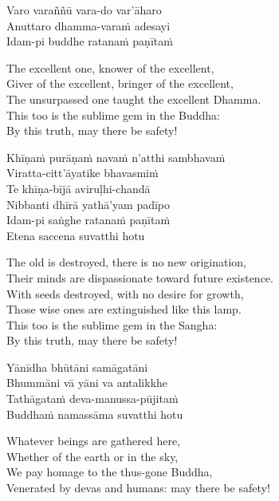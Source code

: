 Varo varaññū vara-do var’āharo\\
Anuttaro dhamma-varaṁ adesayi\\
Idam-pi buddhe ratanaṁ paṇītaṁ

\begin{english}
  The excellent one, knower of the excellent,\\
  Giver of the excellent, bringer of the excellent,\\
  The unsurpassed one taught the excellent Dhamma.\\
  This too is the sublime gem in the Buddha:\\
  By this truth, may there be safety!
\end{english}

Khīṇaṁ purāṇaṁ navaṁ n’atthi sambhavaṁ\\
Viratta-citt’āyatike bhavasmiṁ\\
Te khīṇa-bījā aviruḷhi-chandā\\
Nibbanti dhīrā yathā’yam padīpo\\
Idam-pi saṅghe ratanaṁ paṇītaṁ\\
Etena saccena suvatthi hotu

\begin{english}
  The old is destroyed, there is no new origination,\\
  Their minds are dispassionate toward future existence.\\
  With seeds destroyed, with no desire for growth,\\
  Those wise ones are extinguished like this lamp.\\
  This too is the sublime gem in the Sangha:\\
  By this truth, may there be safety!
\end{english}

Yānīdha bhūtāni samāgatāni\\
Bhummāni vā yāni va antalikkhe\\
Tathāgataṁ deva-manussa-pūjitaṁ\\
Buddhaṁ namassāma suvatthi hotu

\begin{english}
  Whatever beings are gathered here,\\
  Whether of the earth or in the sky,\\
  We pay homage to the thus-gone Buddha,\\
  Venerated by devas and humans: may there be safety!
\end{english}

